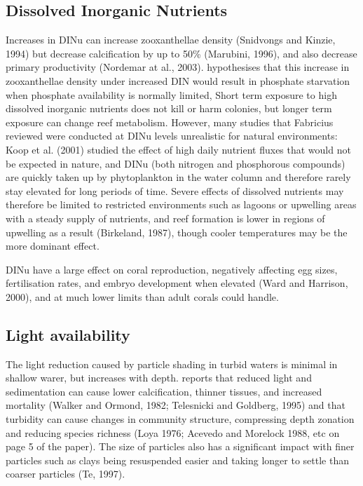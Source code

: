 \documentclass[11pt,a4paper]{article}
\begin{document}
\subsection{Dissolved Inorganic Nutrients}

Increases in DINu can increase zooxanthellae density (Snidvongs and Kinzie, 1994) but decrease calcification by up to 50\% (Marubini, 1996), and also decrease primary productivity (Nordemar at al., 2003).
 \cite{Wiedemann2013} hypothesises that this increase in zooxanthellae density under increased DIN would result in phosphate starvation when phosphate availability is normally limited, 
 Short term exposure to high dissolved inorganic nutrients does not kill or harm colonies, but longer term exposure can change reef metabolism.
  However, many studies that Fabricius reviewed were conducted at DINu levels unrealistic for natural environments: Koop et al. (2001) studied the effect of high daily nutrient fluxes that would not be expected in nature, and DINu (both nitrogen and phosphorous compounds) are quickly taken up by phytoplankton in the water column and therefore rarely stay elevated for long periods of time.
 Severe effects of dissolved nutrients may therefore be limited to restricted environments such as lagoons or upwelling areas with a steady supply of nutrients, and reef formation is lower in regions of upwelling as a result (Birkeland, 1987), though cooler temperatures may be the more dominant effect.

DINu have a large effect on coral reproduction, negatively affecting egg sizes, fertilisation rates, and embryo development when elevated (Ward and Harrison, 2000), and at much lower limits than adult corals could handle.


\subsection{Light availability}

The light reduction caused by particle shading in turbid waters is minimal in shallow warer, but increases with depth.
 \cite{Fabricius2005} reports that reduced light and sedimentation can cause lower calcification, thinner tissues, and increased mortality (Walker and Ormond, 1982; Telesnicki and Goldberg, 1995) and that turbidity can cause changes in community structure, compressing depth zonation and reducing species richness (Loya 1976; Acevedo and Morelock 1988, etc on page 5 of the paper).
  The size of particles also has a significant impact with finer particles such as clays being resuspended easier and taking longer to settle than coarser particles (Te, 1997). 
\end{document}
